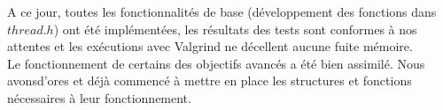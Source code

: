 A ce jour, toutes les fonctionnalités de base (développement des fonctions dans $thread.h$) ont été implémentées, les résultats des tests sont conformes à nos attentes et les exécutions avec Valgrind ne décellent aucune fuite mémoire.\\
Le fonctionnement de certains des objectifs avancés a été bien assimilé. Nous avonsd'ores et déjà commencé à mettre en place les structures et fonctions nécessaires à leur fonctionnement. 